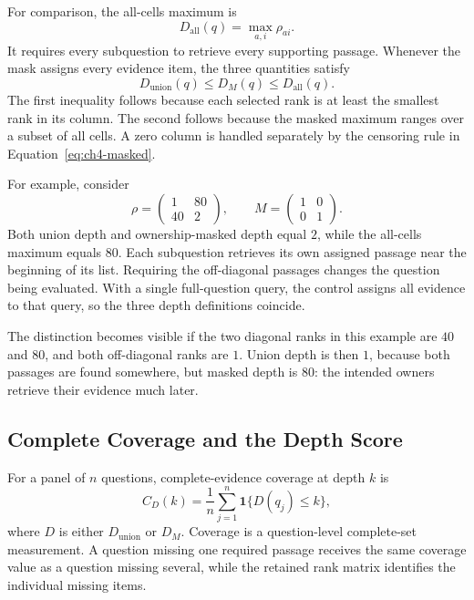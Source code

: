 For comparison, the all-cells maximum is
\begin{equation}
  D_{\mathrm{all}}(q)=\max_{a,i}\rho_{ai}.
  \label{eq:ch4-all}
\end{equation}
It requires every subquestion to retrieve every supporting passage. Whenever
the mask assigns every evidence item, the three quantities satisfy
\begin{equation}
  D_{\mathrm{union}}(q)\leq D_M(q)\leq D_{\mathrm{all}}(q).
  \label{eq:ch4-order}
\end{equation}
The first inequality follows because each selected rank is at least the
smallest rank in its column. The second follows because the masked maximum
ranges over a subset of all cells. A zero column is handled separately by the
censoring rule in Equation~\ref{eq:ch4-masked}.

For example, consider
\begin{equation}
  \rho=
  \begin{pmatrix}1&80\\40&2\end{pmatrix},
  \qquad
  M=\begin{pmatrix}1&0\\0&1\end{pmatrix}.
  \label{eq:ch4-example}
\end{equation}
Both union depth and ownership-masked depth equal $2$, while the all-cells
maximum equals $80$. Each subquestion retrieves its own assigned passage near
the beginning of its list. Requiring the off-diagonal passages changes the
question being evaluated. With a single full-question query, the control assigns
all evidence to that query, so the three depth definitions coincide.

The distinction becomes visible if the two diagonal ranks in this example
are $40$ and $80$, and both off-diagonal ranks are $1$. Union depth is then
$1$, because both passages are found somewhere, but masked depth is $80$:
the intended owners retrieve their evidence much later.

\subsection{Complete Coverage and the Depth Score}

For a panel of $n$ questions, complete-evidence coverage at depth $k$ is
\begin{equation}
  C_D(k)=\frac{1}{n}\sum_{j=1}^{n}
  \mathbf{1}\{D(q_j)\leq k\},
  \label{eq:ch4-coverage}
\end{equation}
where $D$ is either $D_{\mathrm{union}}$ or $D_M$. Coverage is a
question-level complete-set measurement. A question missing one required
passage receives the same coverage value as a question missing several, while
the retained rank matrix identifies the individual missing items.

